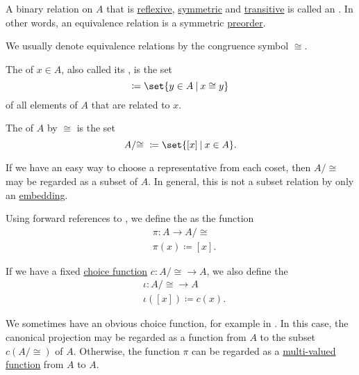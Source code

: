 \begin{definition}\label{def:equivalence_relation}
  A binary relation on \( A \) that is \hyperref[def:binary_relation/reflexive]{reflexive}, \hyperref[def:binary_relation/symmetric]{symmetric} and \hyperref[def:binary_relation/transitive]{transitive} is called an . In other words, an equivalence relation is a symmetric \hyperref[def:preordered_set]{preorder}.

  We usually denote equivalence relations by the congruence symbol \( \cong \).

  \begin{thmenum}
     The  of \( x \in A \), also called its , is the set
    \begin{equation*}
      [x] \coloneqq \set{ y \in A \given x \cong y }
    \end{equation*}
    of all elements of \( A \) that are related to \( x \).

     The  of \( A \) by \( \cong \) is the set
    \begin{equation*}
      A / {\cong} \ \coloneqq \set{ [x] \given x \in A }.
    \end{equation*}

     If we have an easy way to choose a representative from each coset, then \( A / {\cong} \) may be regarded as a subset of \( A \). In general, this is not a subset relation by only an \hyperref[def:first_order_homomorphism_invertibility/embedding]{embedding}.

     Using forward references to , we define the  as the function
    \begin{equation*}
      \begin{aligned}
        &\pi: A \to A / {\cong}  \\
        &\pi(x) \coloneqq [x].
      \end{aligned}
    \end{equation*}

    If we have a fixed \hyperref[def:choice_function]{choice function} \( c: A / {\cong} \to A \), we also define the 
    \begin{equation*}
      \begin{aligned}
        &\iota: A / {\cong} \to A \\
        &\iota([x]) \coloneqq c(x).
      \end{aligned}
    \end{equation*}

    We sometimes have an obvious choice function, for example in . In this case, the canonical projection may be regarded as a function from \( A \) to the subset \( c(A / {\cong}) \) of \( A \). Otherwise, the function \( \pi \) can be regarded as a \hyperref[def:multi_valued_function]{multi-valued function} from \( A \) to \( A \).
  \end{thmenum}
\end{definition}

